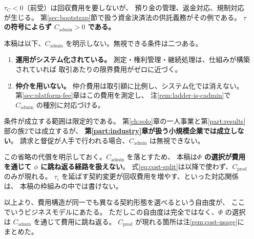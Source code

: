 \begin{remark}[前受にも費用がかかる]
$\tau_C<0$（前受）は回収費用を要しないが、
預り金の管理、返金対応、規制対応が生じる。
第\ref{sec:bootstrap}節で扱う資金決済法の供託義務がその例である。
\textbf{$\tau$ の符号によらず $C_{\mathrm{admin}}>0$ である。}
\end{remark}

\begin{remark}
\label{rem:cadmin-negligible}
本稿は以下、$C_{\mathrm{admin}}$ を明示しない。無視できる条件は二つある。

\begin{enumerate}[label=(\arabic*)]
\item \textbf{運用がシステム化されている。}
測定・権利管理・継続処理は、仕組みが構築されていれば
取引あたりの限界費用がゼロに近づく。
\item \textbf{仲介を用いない。}
仲介費用は取引額に比例し、システム化では消えない。
第\ref{sec:platform-fee}章はこの費用を測定し、
注\ref{rem:ladder-is-cadmin}で $C_{\mathrm{admin}}$ の種別に対応づける。
\end{enumerate}

条件が成立する範囲は限定的である。
第\ref{ch:solo}章の一人事業と第\ref{part:results}部の族2では成立するが、
\textbf{第\ref{part:industry}章が扱う小規模企業では成立しない}。
請求と督促が人手で行われる場合、$C_{\mathrm{admin}}$ は無視できない。

この省略の代償を明示しておく。$C_{\mathrm{admin}}$ を落とすため、
本稿は\textbf{$\Phi$ の選択が費用を通じて $\phi$ に跳ね返る経路を扱えない}。
式\eqref{eq:cost-split}は以降で使わず、$C_{\mathrm{prod}}$ のみが現れる。
$\tau_i$ を延ばす契約変更が回収費用を増やす、といった対応関係は、
本稿の枠組みの中では書けない。
\end{remark}

以上より、費用構造が同一でも異なる契約形態を選べるという自由度が、
ここでいうビジネスモデルにあたる。
ただしこの自由度は完全ではなく、$\Phi$ の選択は $C_{\mathrm{admin}}$ を通じて費用に跳ね返る。
$C_{\mathrm{prod}}$ が現れる箇所は注\ref{rem:cost-usage}にまとめた。

